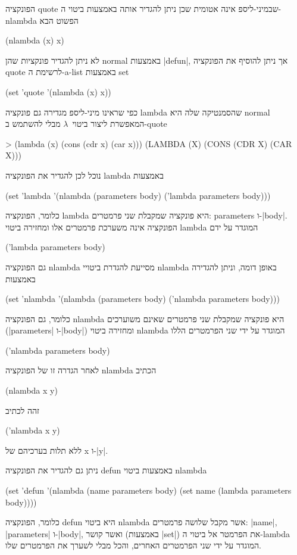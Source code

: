 הפונקציה quote שבמיני-ליספ אינה אטומית שכן ניתן להגדיר אותה באמצעות ביטוי
ה-nlambda הפשוט הבא
\begin{LISP}
(nlambda (x) x)
\end{LISP}
לא ניתן להגדיר פונקציות שהן normal באמצעות \E|defun|, אך ניתן להוסיף את הפונקציה
quote לרשימת ה-a-list באמצעות set
\begin{LIBRARY}
(set 'quote '(nlambda (x) x))
\end{LIBRARY}
כפי שראינו מיני-ליספ מגדירה גם פונקציה lambda שהסמנטיקה שלה היא normal המאפשרת
ליצור ביטוי~$λ$ מבלי להשתמש ב-quote
\begin{LISP}
> (lambda (x) (cons (cdr x) (car x)))
(LAMBDA (X) (CONS (CDR X) (CAR X)))
\end{LISP}
נוכל לכן להגדיר את הפונקציה lambda באמצעות
\begin{LIBRARY}
(set 'lambda '(nlambda (parameters body) ('lambda parameters body)))
\end{LIBRARY}
כלומר, הפונקציה lambda היא פונקציה שמקבלת שני פרמטרים: parameters
ו-\E|body|. הפונקציה אינה משערכת פרמטרים אלו ומחזירה ביטוי lambda המוגדר על ידם
\begin{LISP}
  ('lambda parameters body)
\end{LISP}
גם הפונקציה nlambda מסייעת להגדרת ביטויי nlambda באופן דומה, וניתן להגדירה
באמצעות
\begin{LIBRARY}
(set 'nlambda '(nlambda (parameters body) ('nlambda parameters body)))
\end{LIBRARY}
כלומר, גם הפונקציה nlambda היא פונקציה שמקבלת שני פרמטרים שאינם משוערכים
(\E|parameters| ו-\E|body|) ומחזירה ביטוי nlambda המוגדר על ידי
שני הפרמטרים הללו
\begin{LISP}
  ('nlambda parameters body)
\end{LISP}
לאחר הגדרה זו של הפונקציה nlambda הכתיב
\begin{LISP}
  (nlambda x y)
\end{LISP}
זהה לכתיב
\begin{LISP}
  ('nlambda x y)
\end{LISP}
ללא תלות בערכיהם של x ו-\E|y|.

ניתן גם להגדיר את הפונקציה defun באמצעות ביטוי nlambda
\begin{LIBRARY}
(set 'defun '(nlambda (name parameters body)
  (set name (lambda parameters body))))
\end{LIBRARY}
כלומר, הפונקציה defun היא ביטוי nlambda אשר מקבל שלושה פרמטרים: \E|name|,
\E|parameters| ו-\E|body|, ואשר קושר (באמצעות \E|set|) את הפרמטר אל ביטוי
ה-lambda המוגדר על ידי שני הפרמטרים האחרים, והכל מבלי לשערך את הפרמטרים שלו.

